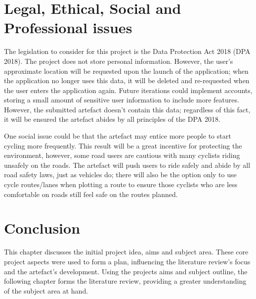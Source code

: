 \clearpage
\section{Legal, Ethical, Social and Professional issues}
\label{intro:legal...issues}

The legislation to consider for this project is the Data Protection Act 2018 (DPA 2018). The project does not store personal information. However, the user’s approximate location will be requested upon the launch of the application; when the application no longer uses this data, it will be deleted and re-requested when the user enters the application again. Future iterations could implement accounts, storing a small amount of sensitive user information to include more features. However, the submitted artefact doesn't contain this data; regardless of this fact, it will be ensured the artefact abides by all principles of the DPA 2018.

One social issue could be that the artefact may entice more people to start cycling more frequently. This result will be a great incentive for protecting the environment, however, some road users are cautious with many cyclists riding unsafely on the roads. The artefact will push users to ride safely and abide by all road safety laws, just as vehicles do; there will also be the option only to use cycle routes/lanes when plotting a route to ensure those cyclists who are less comfortable on roads still feel safe on the routes planned.

\section{Conclusion}
\label{intro:conclusion}

This chapter discusses the initial project idea, aims and subject area. These core project aspects were used to form a plan, influencing the literature review's focus and the artefact's development. Using the projects aims and subject outline, the following chapter forms the literature review, providing a greater understanding of the subject area at hand.